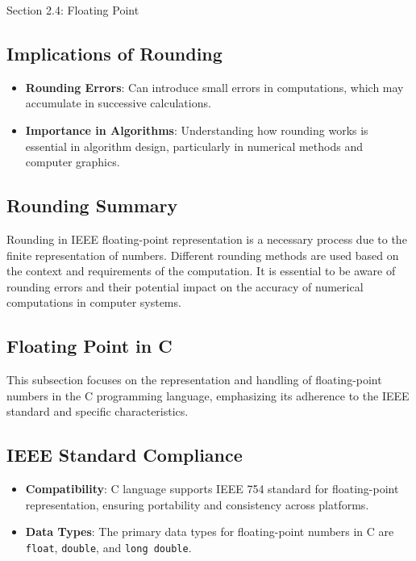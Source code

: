 \begin{notes}{Section 2.4: Floating Point}
    \subsection*{Implications of Rounding}

    \begin{itemize}
        \item \textbf{Rounding Errors}: Can introduce small errors in computations, which may accumulate in successive calculations.
        \item \textbf{Importance in Algorithms}: Understanding how rounding works is essential in algorithm design, particularly in numerical methods and computer graphics.
    \end{itemize}
    
    \subsection*{Rounding Summary}
    
    Rounding in IEEE floating-point representation is a necessary process due to the finite representation of numbers. Different rounding methods are used based on the context and requirements of the 
    computation. It is essential to be aware of rounding errors and their potential impact on the accuracy of numerical computations in computer systems.

    \subsection*{Floating Point in C}

    This subsection focuses on the representation and handling of floating-point numbers in the C programming language, emphasizing its adherence to the IEEE standard and specific characteristics.
    
    \subsection*{IEEE Standard Compliance}
    
    \begin{itemize}
        \item \textbf{Compatibility}: C language supports IEEE 754 standard for floating-point representation, ensuring portability and consistency across platforms.
        \item \textbf{Data Types}: The primary data types for floating-point numbers in C are \texttt{float}, \texttt{double}, and \texttt{long double}.
    \end{itemize}
    

\end{notes}
